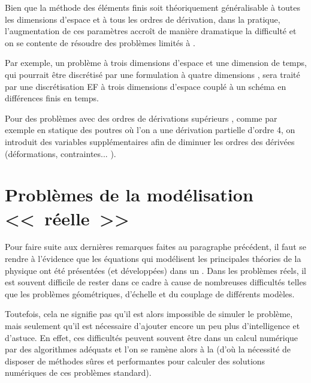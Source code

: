 \medskip
Bien que la méthode des éléments finis soit théoriquement généralisable à toutes les dimensions d'espace et à
tous les ordres de dérivation, dans la pratique, l'augmentation de ces paramètres accroît de
manière dramatique la difficulté et on se contente de résoudre des problèmes limités à
.

Par exemple, un problème à trois dimensions d'espace et une dimension de temps,
qui pourrait être discrétisé par une formulation à quatre dimensions
, sera traité par
une discrétisation EF à trois dimensions d'espace couplé à un schéma en
différences finis en temps.

Pour des problèmes avec des ordres de dérivations supérieurs , comme par exemple en statique des poutres
où l'on a une dérivation partielle d'ordre 4, on introduit des variables supplémentaires
afin de diminuer les ordres des dérivées (déformations, contraintes... ).


\medskip
\section{Problèmes de la modélisation <<~réelle~>>}

Pour faire suite aux dernières remarques faites au paragraphe précédent, il faut
se rendre à l'évidence que les équations qui modélisent les principales théories
de la physique ont été présentées (et développées) dans un .
Dans les problèmes réels, il est souvent difficile de rester dans ce cadre à cause de
nombreuses difficultés telles que les problèmes géométriques, d'échelle et du couplage
de différents modèles.

Toutefois, cela ne signifie pas qu'il est alors impossible de simuler le problème, mais seulement
qu'il est nécessaire d'ajouter encore un peu plus d'intelligence et d'astuce.
En effet, ces difficultés peuvent souvent être  dans un
calcul numérique par des algorithmes adéquats et l'on se ramène alors à la
(d'où la nécessité de disposer de méthodes sûres et performantes pour calculer
des solutions numériques de ces problèmes standard).

